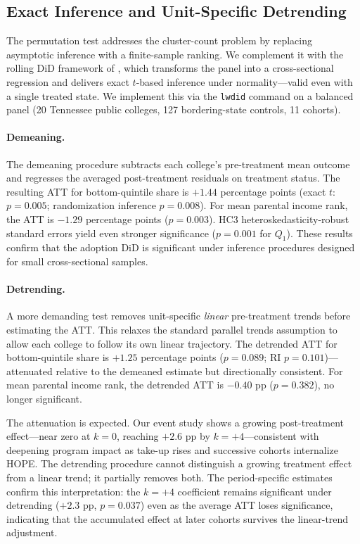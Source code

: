 \subsection{Exact Inference and Unit-Specific Detrending}
\label{sec:robustness_lwdid}

The permutation test addresses the cluster-count problem by replacing
asymptotic inference with a finite-sample ranking. We complement it
with the rolling DiD framework of \textcite{lee2026simple}, which
transforms the panel into a cross-sectional regression and delivers
exact $t$-based inference under normality---valid even with a single
treated state. We implement this via the \texttt{lwdid} command
\parencite{lee2026rolling} on a balanced panel (20 Tennessee public
colleges, 127 bordering-state controls, 11 cohorts).

\paragraph{Demeaning.}

The demeaning procedure subtracts each college's pre-treatment mean
outcome and regresses the averaged post-treatment residuals on
treatment status. The resulting ATT for bottom-quintile share is
$+1.44$ percentage points (exact $t$: $p = 0.005$; randomization
inference $p = 0.008$). For mean parental income rank, the ATT is
$-1.29$ percentage points ($p = 0.003$). HC3 heteroskedasticity-robust
standard errors yield even stronger significance ($p = 0.001$ for
$Q_1$). These results confirm that the adoption DiD is significant
under inference procedures designed for small cross-sectional samples.

\paragraph{Detrending.}

A more demanding test removes unit-specific \emph{linear} pre-treatment
trends before estimating the ATT. This relaxes the standard parallel
trends assumption to allow each college to follow its own linear
trajectory. The detrended ATT for bottom-quintile share is $+1.25$
percentage points ($p = 0.089$; RI $p = 0.101$)---attenuated relative
to the demeaned estimate but directionally consistent. For mean
parental income rank, the detrended ATT is $-0.40$ pp ($p = 0.382$),
no longer significant.

The attenuation is expected. Our event study shows a growing
post-treatment effect---near zero at $k = 0$, reaching $+2.6$ pp by
$k = +4$---consistent with deepening program impact as take-up rises
and successive cohorts internalize HOPE. The detrending procedure
cannot distinguish a growing treatment effect from a linear trend; it
partially removes both. The period-specific estimates confirm this
interpretation: the $k = +4$ coefficient remains significant under
detrending ($+2.3$ pp, $p = 0.037$) even as the average ATT loses
significance, indicating that the accumulated effect at later cohorts
survives the linear-trend adjustment.

